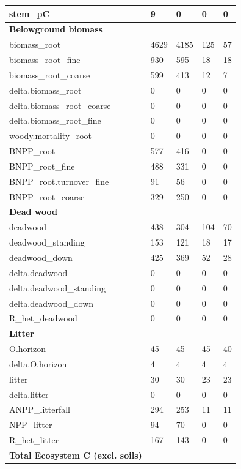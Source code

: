 \documentclass[, manuscript]{copernicus}
\begin{document}
\begin{longtable}[t]{l|l|l|l|l}
\hline
stem\_pC & 9 & 0 & 0 & 0\\
\hline
\textbf{Belowground biomass} & \textbf{} & \textbf{} & \textbf{} & \textbf{}\\
\hline
biomass\_root & 4629 & 4185 & 125 & 57\\
\hline
biomass\_root\_fine & 930 & 595 & 18 & 18\\
\hline
biomass\_root\_coarse & 599 & 413 & 12 & 7\\
\hline
delta.biomass\_root & 0 & 0 & 0 & 0\\
\hline
delta.biomass\_root\_coarse & 0 & 0 & 0 & 0\\
\hline
delta.biomass\_root\_fine & 0 & 0 & 0 & 0\\
\hline
woody.mortality\_root & 0 & 0 & 0 & 0\\
\hline
BNPP\_root & 577 & 416 & 0 & 0\\
\hline
BNPP\_root\_fine & 488 & 331 & 0 & 0\\
\hline
BNPP\_root.turnover\_fine & 91 & 56 & 0 & 0\\
\hline
BNPP\_root\_coarse & 329 & 250 & 0 & 0\\
\hline
\textbf{Dead wood} & \textbf{} & \textbf{} & \textbf{} & \textbf{}\\
\hline
deadwood & 438 & 304 & 104 & 70\\
\hline
deadwood\_standing & 153 & 121 & 18 & 17\\
\hline
deadwood\_down & 425 & 369 & 52 & 28\\
\hline
delta.deadwood & 0 & 0 & 0 & 0\\
\hline
delta.deadwood\_standing & 0 & 0 & 0 & 0\\
\hline
delta.deadwood\_down & 0 & 0 & 0 & 0\\
\hline
R\_het\_deadwood & 0 & 0 & 0 & 0\\
\hline
\textbf{Litter} & \textbf{} & \textbf{} & \textbf{} & \textbf{}\\
\hline
O.horizon & 45 & 45 & 45 & 40\\
\hline
delta.O.horizon & 4 & 4 & 4 & 4\\
\hline
litter & 30 & 30 & 23 & 23\\
\hline
delta.litter & 0 & 0 & 0 & 0\\
\hline
ANPP\_litterfall & 294 & 253 & 11 & 11\\
\hline
NPP\_litter & 94 & 70 & 0 & 0\\
\hline
R\_het\_litter & 167 & 143 & 0 & 0\\
\hline
\textbf{Total Ecosystem C (excl. soils)} & \textbf{} & \textbf{} & \textbf{} & \textbf{}\\

\end{longtable}
\end{document}
